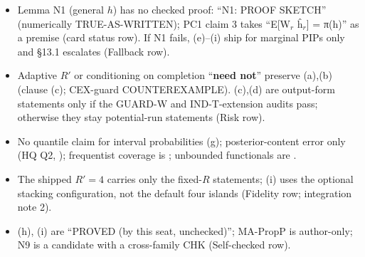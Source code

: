 \begin{notproved}
\begin{itemize}
\item Lemma N1 (general $h$) has no checked proof: ``N1: PROOF SKETCH'' (numerically TRUE-AS-WRITTEN); PC1 claim 3 takes ``E[W$_{r}$ ĥ$_{r}$] = π(h)'' as a premise (card status row). If N1 fails, (e)–(i) ship for marginal PIPs only and §13.1 escalates (Fallback row).
\item Adaptive $R'$ or conditioning on completion ``\textbf{need not}'' preserve (a),(b) (clause (c); CEX-guard COUNTEREXAMPLE). (c),(d) are output-form statements only if the GUARD-W and IND-T-extension audits pass; otherwise they stay potential-run statements (Risk row).
\item No quantile claim for interval probabilities (g); posterior-content error only (HQ Q2, ); frequentist coverage is ; unbounded functionals are .
\item The shipped $R'=4$ carries only the fixed-$R$ statements; (i) uses the optional stacking configuration, not the default four islands (Fidelity row; integration note 2).
\item (h), (i) are ``PROVED (by this seat, unchecked)''; MA-PropP is author-only; N9 is a candidate with a cross-family CHK (Self-checked row).
\end{itemize}
\end{notproved}

